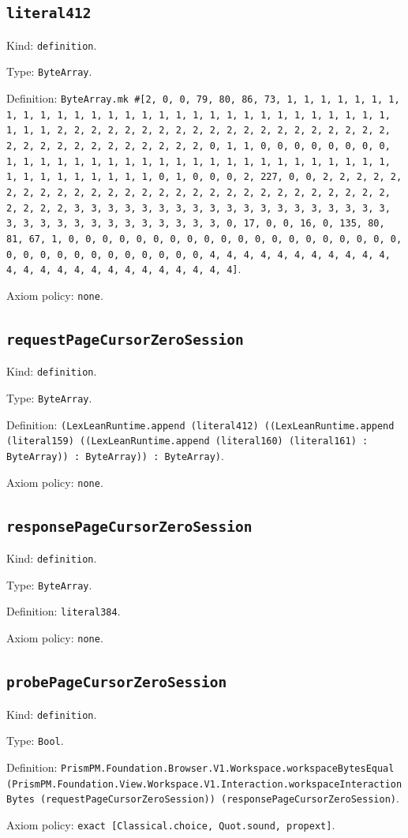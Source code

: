 \documentclass[11pt]{article}
\begin{document}
\subsection*{\texttt{literal412}}
\noindent Kind: \texttt{definition}.\par
\noindent Type: \texttt{ByteArray}.\par
\noindent Definition: \texttt{ByteArray.mk \#[2, 0, 0, 79, 80, 86, 73, 1, 1, 1, 1, 1, 1, 1, 1, 1, 1, 1, 1, 1, 1, 1, 1, 1, 1, 1, 1, 1, 1, 1, 1, 1, 1, 1, 1, 1, 1, 1, 1, 1, 2, 2, 2, 2, 2, 2, 2, 2, 2, 2, 2, 2, 2, 2, 2, 2, 2, 2, 2, 2, 2, 2, 2, 2, 2, 2, 2, 2, 2, 2, 2, 2, 0, 1, 1, 0, 0, 0, 0, 0, 0, 0, 0, 1, 1, 1, 1, 1, 1, 1, 1, 1, 1, 1, 1, 1, 1, 1, 1, 1, 1, 1, 1, 1, 1, 1, 1, 1, 1, 1, 1, 1, 1, 1, 1, 0, 1, 0, 0, 0, 2, 227, 0, 0, 2, 2, 2, 2, 2, 2, 2, 2, 2, 2, 2, 2, 2, 2, 2, 2, 2, 2, 2, 2, 2, 2, 2, 2, 2, 2, 2, 2, 2, 2, 2, 2, 3, 3, 3, 3, 3, 3, 3, 3, 3, 3, 3, 3, 3, 3, 3, 3, 3, 3, 3, 3, 3, 3, 3, 3, 3, 3, 3, 3, 3, 3, 3, 3, 0, 17, 0, 0, 16, 0, 135, 80, 81, 67, 1, 0, 0, 0, 0, 0, 0, 0, 0, 0, 0, 0, 0, 0, 0, 0, 0, 0, 0, 0, 0, 0, 0, 0, 0, 0, 0, 0, 0, 0, 0, 0, 0, 4, 4, 4, 4, 4, 4, 4, 4, 4, 4, 4, 4, 4, 4, 4, 4, 4, 4, 4, 4, 4, 4, 4, 4, 4]}.\par
\noindent Axiom policy: \texttt{none}.\par
\subsection*{\texttt{requestPageCursorZeroSession}}
\noindent Kind: \texttt{definition}.\par
\noindent Type: \texttt{ByteArray}.\par
\noindent Definition: \texttt{(LexLeanRuntime.append (literal412) ((LexLeanRuntime.append (literal159) ((LexLeanRuntime.append (literal160) (literal161) : ByteArray)) : ByteArray)) : ByteArray)}.\par
\noindent Axiom policy: \texttt{none}.\par
\subsection*{\texttt{responsePageCursorZeroSession}}
\noindent Kind: \texttt{definition}.\par
\noindent Type: \texttt{ByteArray}.\par
\noindent Definition: \texttt{literal384}.\par
\noindent Axiom policy: \texttt{none}.\par
\subsection*{\texttt{probePageCursorZeroSession}}
\noindent Kind: \texttt{definition}.\par
\noindent Type: \texttt{Bool}.\par
\noindent Definition: \texttt{PrismPM.Foundation.Browser.V1.Workspace.workspaceBytesEqual (PrismPM.Foundation.View.Workspace.V1.Interaction.workspaceInteractionBytes (requestPageCursorZeroSession)) (responsePageCursorZeroSession)}.\par
\noindent Axiom policy: \texttt{exact [Classical.choice, Quot.sound, propext]}.\par
\end{document}
